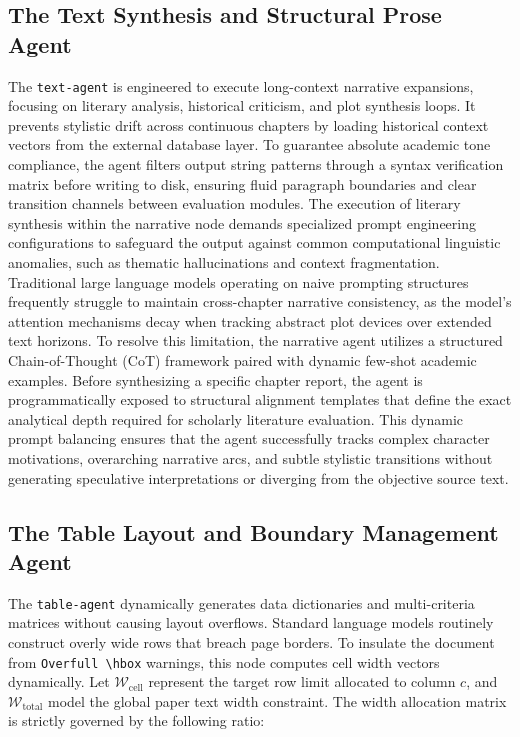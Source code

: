 \subsection{The Text Synthesis and Structural Prose Agent}
The \texttt{text-agent} is engineered to execute long-context narrative expansions, focusing on literary analysis, historical criticism, and plot synthesis loops. It prevents stylistic drift across continuous chapters by loading historical context vectors from the external database layer. To guarantee absolute academic tone compliance, the agent filters output string patterns through a syntax verification matrix before writing to disk, ensuring fluid paragraph boundaries and clear transition channels between evaluation modules. The execution of literary synthesis within the narrative node demands specialized prompt engineering configurations to safeguard the output against common computational linguistic anomalies, such as thematic hallucinations and context fragmentation. Traditional large language models operating on naive prompting structures frequently struggle to maintain cross-chapter narrative consistency, as the model's attention mechanisms decay when tracking abstract plot devices over extended text horizons. To resolve this limitation, the narrative agent utilizes a structured Chain-of-Thought (CoT) framework paired with dynamic few-shot academic examples. Before synthesizing a specific chapter report, the agent is programmatically exposed to structural alignment templates that define the exact analytical depth required for scholarly literature evaluation. This dynamic prompt balancing ensures that the agent successfully tracks complex character motivations, overarching narrative arcs, and subtle stylistic transitions without generating speculative interpretations or diverging from the objective source text.

\subsection{The Table Layout and Boundary Management Agent}
The \texttt{table-agent} dynamically generates data dictionaries and multi-criteria matrices without causing layout overflows. Standard language models routinely construct overly wide rows that breach page borders. To insulate the document from \texttt{Overfull \textbackslash hbox} warnings, this node computes cell width vectors dynamically. Let \(\mathcal{W}_{\text{cell}}\) represent the target row limit allocated to column \(c\), and \(\mathcal{W}_{\text{total}}\) model the global paper text width constraint. The width allocation matrix is strictly governed by the following ratio:

